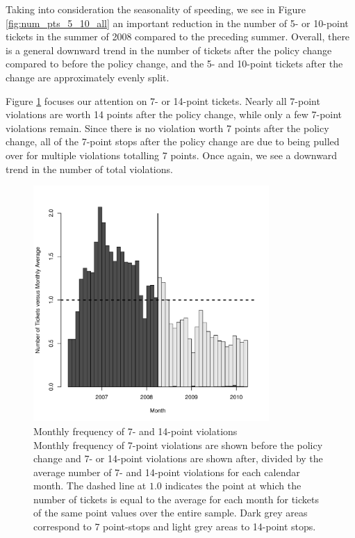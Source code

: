\documentclass{cje}
\begin{document}
Taking into consideration the seasonality of speeding, we see 
in Figure \ref{fig:num_pts_5_10_all}
an important reduction in the number of 5- or 10-point tickets 
in the summer of 2008 compared to the preceding summer. 
Overall, there is a general downward trend in the number of tickets 
after the policy change compared to before the policy change, 
and the 5- and 10-point tickets after the change are approximately evenly split. 

Figure \ref{fig:num_pts_7_14_all} focuses our attention on 7- or 14-point tickets. 
Nearly all 7-point violations are worth 14 points after the policy change, 
while only a few 7-point violations remain. 
Since there is no violation worth 7 points after the policy change, 
all of the 7-point stops after the policy change are due to being pulled over 
for multiple violations totalling 7 points. 
Once again, we see a downward trend in the number of total violations. 


\begin{figure}
\centering
\includegraphics[width=0.8\textwidth]{Figure2}
\caption{Monthly frequency of 7- and 14-point violations \\
Monthly frequency of 7-point violations are shown before the policy change 
and 7- or 14-point violations are shown after, 
divided by the average number of 7- and 14-point violations
for each calendar month. 
% 
The dashed line at $1.0$ indicates the point at which 
the number of tickets is equal to the average for each month 
for tickets of the same point values over the entire sample.
% 
Dark grey areas correspond to 7 point-stops and light grey areas to 14-point stops.
}\label{fig:num_pts_7_14_all}
\end{figure}
\end{document}
